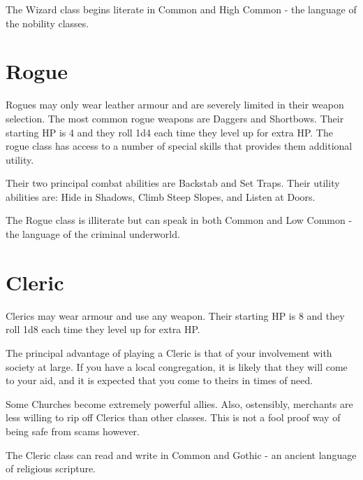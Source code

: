 \begin{multicols}{2}
The Wizard class begins literate in Common and High Common - the language of the nobility classes.  
 
\section{Rogue} Rogues may only wear leather armour and are severely limited in their weapon selection. The most common rogue weapons are Daggers and Shortbows. Their starting HP is 4 and they roll 1d4 each time they level up for extra HP. The rogue class has access to a number of special skills that provides them additional utility. 

Their two principal combat abilities are Backstab and Set Traps. Their utility abilities are: Hide in Shadows, Climb Steep Slopes, and Listen at Doors.

The Rogue class is illiterate but can speak in both Common and Low Common - the language of the criminal underworld. 

\section{Cleric}

Clerics may wear armour and use any weapon. Their starting HP is 8 and they roll 1d8 each time they level up for extra HP. 

The principal advantage of playing a Cleric is that of your involvement with society at large. If you have a local congregation, it is likely that they will come to your aid, and it is expected that you come to theirs in times of need. 

Some Churches become extremely powerful allies. Also, ostensibly, merchants are less willing to rip off Clerics than other classes. This is not a fool proof way of being safe from scams however.  

The Cleric class can read and write in Common and Gothic - an ancient language of religious scripture.

\end{multicols}
